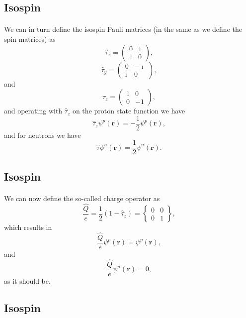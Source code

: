 \documentclass[%
twoside,                 %
final,                   %
10pt]{article}
\begin{document}
\subsection*{Isospin}

\paragraph{}
We can in turn define the isospin Pauli matrices (in the same as we define the spin matrices) as
\[
\hat{\tau}_x =\left(\begin{array}{cc} 0 & 1 \\ 1 & 0 \end{array}\right),
\]
\[
\hat{\tau}_y =\left(\begin{array}{cc} 0 & -\imath \\ \imath & 0 \end{array}\right),
\]
and
\[
\hat{\tau}_z =\left(\begin{array}{cc} 1 & 0 \\ 0 & -1 \end{array}\right),
\]
and operating with $\hat{\tau}_z$ on the proton state function we have
\[
\hat{\tau}_z\psi^p(\mathbf{r})=-\frac{1}{2}\psi^p(\mathbf{r}),
\]
and for neutrons we have
\[
\hat{\tau}\psi^n(\mathbf{r})=\frac{1}{2}\psi^n(\mathbf{r}).
\]



\subsection*{Isospin}

\paragraph{}
We can now define the so-called charge operator as 
\[
\frac{\hat{Q}}{e} = \frac{1}{2}\left(1-\hat{\tau}_z\right)=\begin{Bmatrix} 0 & 0 \\ 0 & 1 \end{Bmatrix},
\]
which results in 
\[
\frac{\hat{Q}}{e}\psi^p(\mathbf{r})=\psi^p(\mathbf{r}),
\]
and
\[
\frac{\hat{Q}}{e}\psi^n(\mathbf{r})=0,
\]
as it should be.



\subsection*{Isospin}
\end{document}
